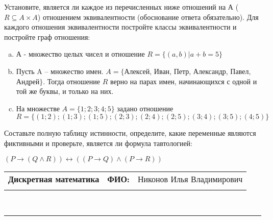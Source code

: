\documentclass[10pt]{exam}
\newcommand{\class}{Дискретная математика}
\newcommand{\examdate}{}
\begin{document}
\begin{questions}
\question
Установите, является ли каждое из перечисленных ниже отношений на А ($R \subseteq A \times A$) отношением эквивалентности (обоснование ответа обязательно). Для каждого отношения эквивалентности постройте классы 
эквивалентности и постройте граф отношения:
\begin{enumerate} [a)]\setcounter{enumi}{0}
\item А - множество целых чисел и отношение $R = \{(a,b)|a + b = 5\}$
\item Пусть A – множество имен. $A = \{ $Алексей, Иван, Петр, Александр, Павел, Андрей$ \}$. Тогда отношение $R $ верно на парах имен, начинающихся с одной и той же буквы, и только на них.
\item На множестве $A = \{1; 2; 3; 4; 5\}$ задано отношение $R = \{(1; 2); (1; 3); (1; 5); (2; 3); (2; 4); (2; 5); (3; 4); (3; 5); (4; 5)\}$
\end{enumerate}\question Составьте полную таблицу истинности, определите, какие переменные являются фиктивными и проверьте, является ли формула тавтологией:

$(P \rightarrow (Q \land R)) \leftrightarrow ((P \rightarrow Q) \land (P \rightarrow R))$

\end{questions}
\newpage
\begin{flushright}
\begin{tabular}{p{2.8in} r l}
\textbf{\class} & \textbf{ФИО:} &Никонов Илья Владимирович
\\

\textbf{\examdate} &&\\
\end{tabular}\\
\end{flushright}
\rule[1ex]{\textwidth}{.1pt}
\end{document}
